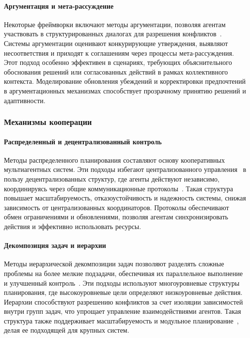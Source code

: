 \documentclass[%
]{ittmm}
\begin{document}
\paragraph{Аргументация и мета-рассуждение}

Некоторые фреймворки включают методы аргументации,
позволяя агентам участвовать в структурированных диалогах для разрешения конфликтов~\cite{PAJARESFERRANDO201322,FERRANDO20171}.
Системы аргументации оценивают конкурирующие утверждения,
выявляют несоответствия и приходят к соглашениям через процессы мета-рассуждения.
Этот подход особенно эффективен в сценариях,
требующих объяснительного обоснования решений или согласованных действий в рамках коллективного контекста.
Моделирование обновления убеждений и корректировки предпочтений
в аргументационных механизмах способствует прозрачному принятию решений и адаптивности.

\subsubsection{Механизмы кооперации}

\paragraph{Распределенный и децентрализованный контроль}

Методы распределенного планирования составляют основу кооперативных мультиагентных систем.
Эти подходы избегают централизованного управления~\cite{DURFEE1988268,GRASTIEN2020103271,MA2021103823}
в пользу децентрализованных структур, где агенты действуют независимо,
координируясь через общие коммуникационные протоколы~\cite{ROSENSCHEIN1988187}.
Такая структура повышает масштабируемость, отказоустойчивость и надежность системы,
снижая зависимость от централизованных координаторов.
Протоколы обеспечивают обмен ограничениями и обновлениями, позволяя агентам синхронизировать действия и эффективно использовать ресурсы.

\paragraph{Декомпозиция задач и иерархии}

Методы иерархической декомпозиции задач позволяют разделять сложные проблемы на более мелкие подзадачи,
обеспечивая их параллельное выполнение и улучшенный контроль~\cite{JUNG1999149}.
Эти подходы используют многоуровневые структуры планирования,
где высокоуровневые цели определяют низкоуровневые действия.
Иерархии способствуют разрешению конфликтов за счет изоляции зависимостей внутри групп задач,
что упрощает управление взаимодействиями агентов.
Такая структура также поддерживает масштабируемость и модульное планирование~\cite{RODRIGUEZ201113005},
делая ее подходящей для крупных систем.
\end{document}
